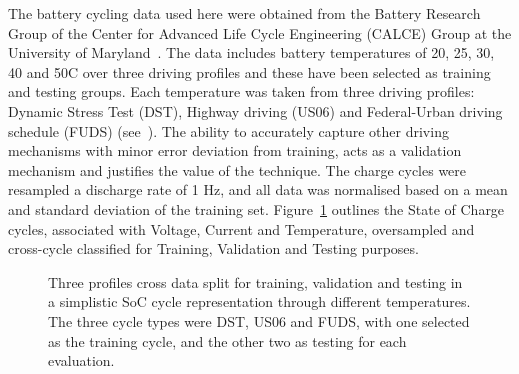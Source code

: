 %
%
{The battery cycling data used here were obtained from the Battery Research Group of the Center for Advanced Life Cycle Engineering (CALCE) Group at the University of Maryland~\cite{noauthor_calce_2017}.}
The data includes battery temperatures of 20, 25, 30, 40 and 50\textdegree{}C over three driving profiles and these have been selected as training and testing groups.
Each temperature was taken from three driving profiles: Dynamic Stress Test (DST), Highway driving (US06) and Federal-Urban driving schedule (FUDS) (see~\cite{castillo_18_2015}).
The ability to accurately capture other driving mechanisms with minor error deviation from training, acts as a validation mechanism and justifies the value of the technique.
The charge cycles were resampled a discharge rate of 1 Hz, and all data was normalised based on a mean and standard deviation of the training set.
Figure~\ref{fig:cross-data} outlines the State of Charge cycles, associated with Voltage, Current and Temperature, oversampled and cross-cycle classified for Training, Validation and Testing purposes.
\begin{figure}[ht]
    \centering
    
    \caption{Three profiles cross data split for training, validation and testing in a simplistic SoC cycle representation through different temperatures. The three cycle types were DST, US06 and FUDS, with one selected as the training cycle, and the other two as testing for each evaluation.}
    \label{fig:cross-data}
\end{figure}

